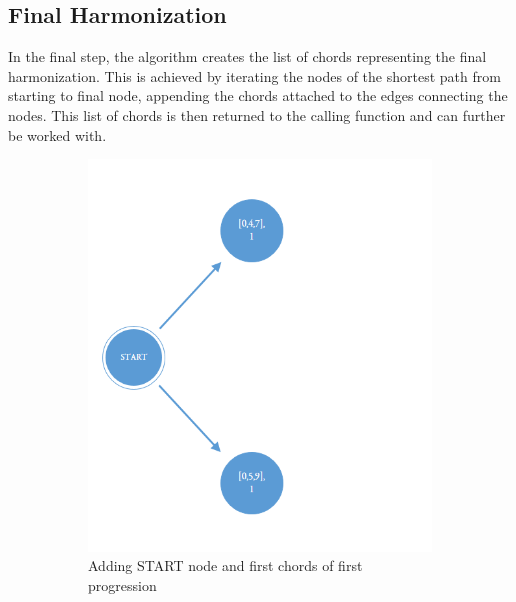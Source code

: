 
\subsection{Final Harmonization}
In the final step, the algorithm creates the list of chords representing the final harmonization. This is achieved by iterating the nodes of the shortest path from starting to final node, appending the chords attached to the edges connecting the nodes. This list of chords is then returned to the calling function and can further be worked with.

\begin{figure}[!tbp]
\vspace*{-3cm}
\centering
\begin{subfigure}[b]{0.43\linewidth}
   \includegraphics[width=\linewidth]{Chapters/pic/41}
   \caption{Adding START node and first chords of first progression}
   \label{fig:41} 
\end{subfigure}
\hfill
\begin{subfigure}[b]{0.49\linewidth}

\end{subfigure}
\end{figure}
